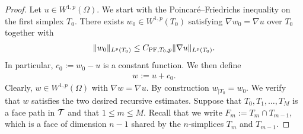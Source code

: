 \documentclass[10pt,letterpaper]{article}
\begin{document}
\begin{proof}
    Let $u \in W^{1,p}(\Omega)$. 
    We start with the Poincar\'e--Friedrichs inequality on the first simplex $T_{0}$. 
    There exists $w_0 \in W^{1,p}(T_{0})$ satisfying $\nabla w_0 = \nabla u$ over $T_{0}$ together with 
    \begin{gather*}
        \| w_0 \|_{L^{p}(T_{0})} \leq C_{{\rm{PF}},T_{0},p} \| \nabla u \|_{L^{p}(T_{0})}.
    \end{gather*}
    In particular, $c_{0} := w_0 - u$ is a constant function. 
    We then define 
    \begin{align*}
        w := u + c_0
        .
    \end{align*} 
    Clearly, $w \in W^{1,p}(\Omega)$ with $\nabla w = \nabla u$.
    By construction $w_{|T_{0}} = w_0$. 
    We verify that $w$ satisfies the two desired recursive estimates.
    Suppose that $T_0, T_1, \dots, T_M$ is a face path in ${\mathcal T}$
    and that $1 \leq m \leq M$.
    Recall that we write $F_m := T_m \cap T_{m-1}$, which is a face of dimension $n-1$ shared by the $n$-simplices $T_{m}$ and $T_{m-1}$. 
    

\end{proof}
\end{document}
